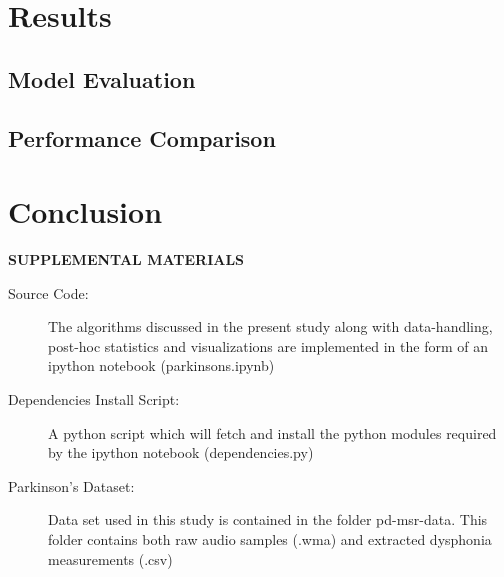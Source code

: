 \documentclass[12pt]{article}
\begin{document}
\section{Results}
\subsection{Model Evaluation}
\subsection{Performance Comparison}

\section{Conclusion}
\label{sec:conc}


\bigskip
\begin{center}
{\large\bf SUPPLEMENTAL MATERIALS}
\end{center}

\begin{description}

\item[Source Code:] The algorithms discussed in the present study along with data-handling, post-hoc statistics and visualizations are implemented in the form of an ipython notebook (parkinsons.ipynb)

\item[Dependencies Install Script:] A python script which will fetch and install the  python modules required by the ipython notebook (dependencies.py)

\item[Parkinson's Dataset:] Data set used in this study is contained in the folder pd-msr-data. This folder contains both raw audio samples (.wma) and extracted dysphonia measurements (.csv)

\end{description}



\end{document}
